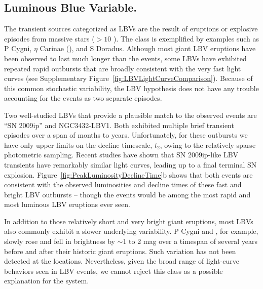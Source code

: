 \subsection{Luminous Blue Variable.}

The transient sources categorized as LBVs are the result of eruptions
or explosive episodes from massive stars ($>10$ \Msun).
The class is exemplified by examples such as P Cygni, $\eta$ Carinae
(\etaCar), and S Doradus\cite{Smith:2011b, Kochanek:2012}.  Although
most giant LBV eruptions have been observed to last much longer than
the \spock events\cite{Smith:2011b}, some LBVs have exhibited repeated
rapid outbursts that are broadly consistent with the very fast \spock
light curves (see Supplementary
Figure~\ref{fig:LBVLightCurveComparison}). Because of this common
stochastic variability, the LBV hypothesis does not have any trouble
accounting for the \spock events as two separate episodes.

Two well-studied LBVs that provide a plausible match to the observed
\spock events are ``SN 2009ip''\cite{Maza:2009} and
NGC3432-LBV1\cite{Pastorello:2010}.  Both exhibited multiple brief
transient episodes over a span of months to years.  Unfortunately,
for these outbursts we have only upper limits on the decline
timescale, $t_2$, owing to the relatively sparse photometric sampling.
Recent studies have shown that SN 2009ip-like LBV transients have remarkably
similar light curves, leading up to a final terminal SN
explosion\cite{Kilpatrick:2017, Pastorello:2017}.
Figure~\ref{fig:PeakLuminosityDeclineTime}b shows that both \spock
events are consistent with the observed luminosities and decline times
of these fast and bright LBV outbursts -- though the \spock events
would be among the most rapid and most luminous LBV eruptions ever
seen.

In addition to those relatively short and very bright giant eruptions,
most LBVs also commonly exhibit a slower underlying variability. P
Cygni and \etaCar, for example, slowly rose and fell in brightness by
$\sim$1 to 2 mag over a timespan of several years before and after
their historic giant eruptions.  Such variation has not been detected
at the \spock locations. Nevertheless, given the broad
range of light-curve behaviors seen in LBV events, we cannot reject
this class as a possible explanation for the \spock system.

